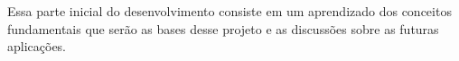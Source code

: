Essa parte inicial do desenvolvimento consiste em um aprendizado dos conceitos 
fundamentais que serão as bases desse projeto e as discussões sobre as futuras 
aplicações.
